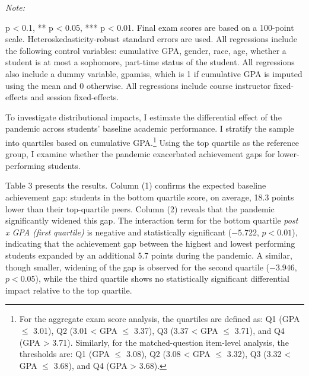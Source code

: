 \documentclass[
  12pt,
  letterpaper,
  DIV=11,
  numbers=noendperiod]{scrartcl}
\begin{document}
\begin{table}[H]
{\begin{threeparttable}
\begin{tabular}[t]{lcccc}
\bottomrule
\end{tabular}
\begin{tablenotes}[para]
\item \textit{Note: } 
\item * p < 0.1, ** p < 0.05, *** p < 0.01. Final exam scores are based on a 100-point scale. Heteroskedasticity-robust standard errors are used. All regressions include the following control variables: cumulative GPA, gender, race, age, whether a student is at most a sophomore, part-time status of the student. All regressions also include a dummy variable, gpamiss, which is 1 if cumulative GPA is imputed using the mean and 0 otherwise. All regressions include course instructor fixed-effects and session fixed-effects.
\end{tablenotes}
\end{threeparttable}}
\end{table}

To investigate distributional impacts, I estimate the differential
effect of the pandemic across students' baseline academic performance. I
stratify the sample into quartiles based on cumulative GPA.\footnote{For
  the aggregate exam score analysis, the quartiles are defined as: Q1
  (GPA \(\leq\) 3.01), Q2 (3.01 \textless{} GPA \(\leq\) 3.37), Q3 (3.37
  \textless{} GPA \(\leq\) 3.71), and Q4 (GPA \textgreater{} 3.71).
  Similarly, for the matched-question item-level analysis, the
  thresholds are: Q1 (GPA \(\leq\) 3.08), Q2 (3.08 \textless{} GPA
  \(\leq\) 3.32), Q3 (3.32 \textless{} GPA \(\leq\) 3.68), and Q4 (GPA
  \textgreater{} 3.68).} Using the top quartile as the reference group,
I examine whether the pandemic exacerbated achievement gaps for
lower-performing students.

Table 3 presents the results. Column (1) confirms the expected baseline
achievement gap: students in the bottom quartile score, on average, 18.3
points lower than their top-quartile peers. Column (2) reveals that the
pandemic significantly widened this gap. The interaction term for the
bottom quartile \emph{post x GPA (first quartile)} is negative and
statistically significant (\(-5.722\), \(p < 0.01\)), indicating that
the achievement gap between the highest and lowest performing students
expanded by an additional 5.7 points during the pandemic. A similar,
though smaller, widening of the gap is observed for the second quartile
(\(-3.946\), \(p < 0.05\)), while the third quartile shows no
statistically significant differential impact relative to the top
quartile.
\end{document}
